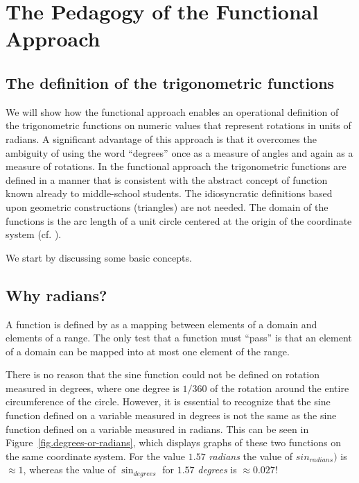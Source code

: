 
\chapter{The Pedagogy of the Functional Approach}

\section{The definition of the trigonometric functions}

We will show how the functional approach enables an operational definition of the  trigonometric functions on numeric values that represent rotations in units of radians.
A significant advantage of this approach is that it overcomes the ambiguity of using the word ``degrees'' once as a measure of angles and again as a measure of rotations.
In the functional approach the trigonometric functions are defined in a manner that is consistent with the abstract concept of function known already to middle-school students. The idiosyncratic definitions based upon geometric constructions (triangles) are not needed. The domain of the functions is the arc length of a unit circle centered at the origin of the coordinate system (cf. \cite{moore}).

We start by discussing some basic concepts.

\section{Why radians?}

A function is defined by as a mapping between elements of a domain and elements of a range. The only test that a function must ``pass'' is that an element of a domain can be mapped into at most one element of the range.

There is no reason that the sine function could not be defined on rotation measured in degrees, where one degree is $1/360$ of the rotation around the entire circumference of the circle. However, it is essential to recognize that the sine function defined on a variable measured in degrees is not the same as the sine function defined on a variable measured in radians. This can be seen in 
Figure~\ref{fig.degrees-or-radians}, which displays graphs of these two functions on the same coordinate system. For the value $1.57$ \emph{radians} the value of $sin_{\textit{radians}})$ is $\approx 1$, whereas the value of $\sin_{\textit{degrees}}$ for $1.57$ \emph{degrees} is $\approx 0.027$!


